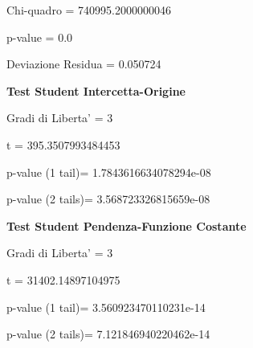 \documentclass{article}
\begin{document}
Chi-quadro = 740995.2000000046

p-value = 0.0

Deviazione Residua = 0.050724

\textbf{Test Student Intercetta-Origine}

Gradi di Liberta' = 3

t = 395.3507993484453

p-value (1 tail)= 1.7843616634078294e-08

p-value (2 tails)= 3.568723326815659e-08

\textbf{Test Student Pendenza-Funzione Costante}

Gradi di Liberta' = 3

t = 31402.14897104975

p-value (1 tail)= 3.560923470110231e-14

p-value (2 tails)= 7.121846940220462e-14
\end{document}
